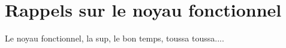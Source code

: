 \section{Rappels sur le noyau fonctionnel}

\begin{frame}
  \begin{center}
  Le noyau fonctionnel, la sup, le bon temps, toussa toussa....
\end{center}
\end{frame}
\subsection{}
\begin{frame}
  \end {frame}
